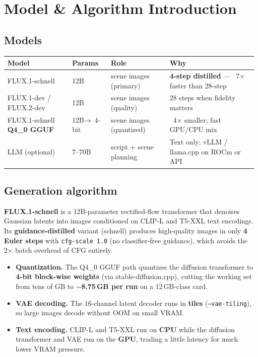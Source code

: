 \documentclass[UTF8,fontset=mac,a4paper,11pt]{ctexart}
\begin{document}
\section{Model \& Algorithm Introduction}

\subsection{Models}

\begin{table}[h]
  \centering
  \begin{tabular}{@{}p{3.6cm}p{2.4cm}p{3.6cm}p{4.6cm}@{}}
    \toprule
    \textbf{Model} & \textbf{Params} & \textbf{Role} & \textbf{Why} \\
    \midrule
    FLUX.1-schnell & 12B & scene images (primary)
      & \textbf{4-step distilled} --- ~7× faster than 28-step \\
    FLUX.1-dev / FLUX.2-dev & 12B & scene images (quality)
      & 28 steps when fidelity matters \\
    FLUX.1-schnell \textbf{Q4\_0 GGUF} & 12B→~4-bit & scene images (quantized)
      & ~4× smaller; fast GPU/CPU mix \\
    LLM (optional) & 7--70B & script + scene planning
      & Text only; vLLM / llama.cpp on ROCm or API \\
    \bottomrule
  \end{tabular}
\end{table}

\subsection{Generation algorithm}

\textbf{FLUX.1-schnell} is a 12B-parameter rectified-flow transformer that
denoises Gaussian latents into images conditioned on CLIP-L and T5-XXL text
encodings. Its \textbf{guidance-distilled} variant (schnell) produces
high-quality images in only \textbf{4 Euler steps} with
\texttt{cfg-scale~1.0} (no classifier-free guidance), which avoids the
2× batch overhead of CFG entirely.

\begin{itemize}
  \item \textbf{Quantization.} The Q4\_0 GGUF path quantizes the diffusion
        transformer to \textbf{4-bit block-wise weights} (via
        stable-diffusion.cpp), cutting the working set from tens of GB to
        \textbf{$\sim$8.75\,GB per run} on a 12\,GB-class card.
  \item \textbf{VAE decoding.} The 16-channel latent decoder runs in
        \textbf{tiles} (\texttt{--vae-tiling}), so large images decode
        without OOM on small VRAM.
  \item \textbf{Text encoding.} CLIP-L and T5-XXL run on \textbf{CPU} while
        the diffusion transformer and VAE run on the \textbf{GPU}, trading a
        little latency for much lower VRAM pressure.
\end{itemize}
\end{document}
